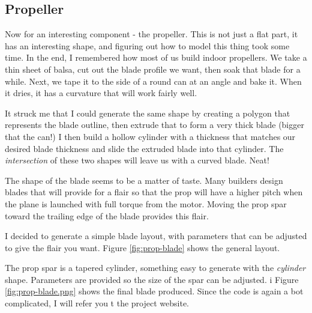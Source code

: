 \subsection{Propeller}

Now for an interesting component - the propeller. This is not just a flat part,
it has an interesting shape, and figuring out how to model this thing took some
time. In the end, I remembered how most of us build indoor propellers. We take a
thin sheet of balsa, cut out the blade profile we want, then soak that blade
for a while. Next, we tape it to the side of a round can at an angle and bake
it. When it dries, it has a curvature that will work fairly well.

It struck me that I could generate the same shape by creating a polygon that
represents the blade outline, then extrude that to form a very thick blade
(bigger that the can!) I then build a hollow cylinder with a thickness that
matches our desired blade thickness and slide the extruded blade into that cylinder.
The {\it intersection} of these two shapes will leave us with a curved blade.
Neat!

The shape of the blade seems to be a matter of taste. Many builders design
blades that will provide for a flair so that the prop will have a higher pitch
when the plane is launched with full torque from the motor. Moving the prop
spar toward the trailing edge of the blade provides this flair.

I decided to generate a simple blade layout, with parameters that can be
adjusted to give the flair you want. Figure \ref{fig:prop-blade} shows the
general layout.


The prop spar is a tapered cylinder, something easy to generate with the {\it
cylinder} shape. Parameters are provided so the size of the spar can be
adjusted.
i
Figure \ref{fig:prop-blade.png} shows the final blade produced. Since the code is
again a bot complicated, I will refer you t the project website.



